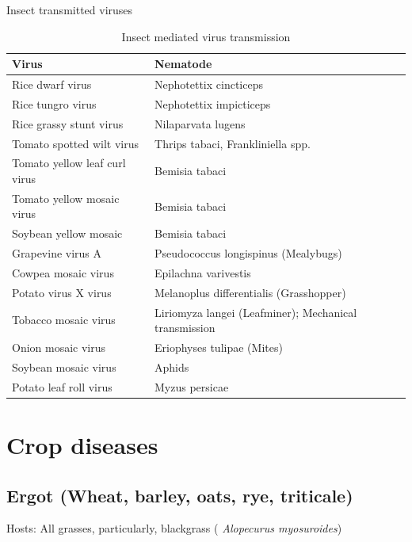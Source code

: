 \documentclass[
  openany]{book}
\begin{document}
Insect transmitted viruses

\begin{table}

\caption{\label{tab:insect-transmissed-viruses}Insect mediated virus transmission}
\centering
\begin{tabular}[t]{ll}
\toprule
Virus & Nematode\\
\midrule
Rice dwarf virus & Nephotettix cincticeps\\
Rice tungro virus & Nephotettix impicticeps\\
Rice grassy stunt virus & Nilaparvata lugens\\
Tomato spotted wilt virus & Thrips tabaci, Frankliniella spp.\\
Tomato yellow leaf curl virus & Bemisia tabaci\\
\addlinespace
Tomato yellow mosaic virus & Bemisia tabaci\\
Soybean yellow mosaic & Bemisia tabaci\\
Grapevine virus A & Pseudococcus longispinus (Mealybugs)\\
Cowpea mosaic virus & Epilachna varivestis\\
Potato virus X virus & Melanoplus differentialis (Grasshopper)\\
\addlinespace
Tobacco mosaic virus & Liriomyza langei (Leafminer); Mechanical transmission\\
Onion mosaic virus & Eriophyses tulipae (Mites)\\
Soybean mosaic virus & Aphids\\
Potato leaf roll virus & Myzus persicae\\
\bottomrule
\end{tabular}
\end{table}

\hypertarget{crop-diseases}{%
\section{Crop diseases}\label{crop-diseases}}

\hypertarget{ergot-wheat-barley-oats-rye-triticale}{%
\subsection{Ergot (Wheat, barley, oats, rye, triticale)}\label{ergot-wheat-barley-oats-rye-triticale}}

Hosts:
All grasses, particularly, blackgrass ( \emph{Alopecurus myosuroides})
\end{document}
